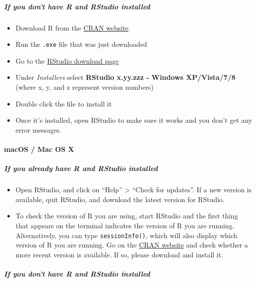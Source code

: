 \documentclass[12pt, krantz2,]{krantz}
\providecommand{\tightlist}{%
  \setlength{\itemsep}{0pt}\setlength{\parskip}{0pt}}
\let\oldparagraph\paragraph
\renewcommand{\paragraph}[1]{\oldparagraph{#1}\mbox{}}
\let\oldsubparagraph\subparagraph
\renewcommand{\subparagraph}[1]{\oldsubparagraph{#1}\mbox{}}
\theoremstyle{definition}
\theoremstyle{definition}
\theoremstyle{definition}
\newcommand{\1}{\mathbbm{1}}
\begin{document}
\hypertarget{if-you-dont-have-r-and-rstudio-installed}{%
\subparagraph{If you don't have R and RStudio installed}\label{if-you-dont-have-r-and-rstudio-installed}}

\begin{itemize}
\tightlist
\item
  Download R from
  the \href{http://cran.r-project.org/bin/windows/base/release.htm}{CRAN website}.
\item
  Run the \texttt{.exe} file that was just downloaded
\item
  Go to the \href{https://www.rstudio.com/products/rstudio/download/\#download}{RStudio download page}
\item
  Under \emph{Installers} select \textbf{RStudio x.yy.zzz - Windows
  XP/Vista/7/8} (where x, y, and z represent version numbers)
\item
  Double click the file to install it
\item
  Once it's installed, open RStudio to make sure it works and you don't get any
  error messages.
\end{itemize}

\hypertarget{macos-mac-os-x}{%
\paragraph{macOS / Mac OS X}\label{macos-mac-os-x}}

\hypertarget{if-you-already-have-r-and-rstudio-installed-1}{%
\subparagraph{If you already have R and RStudio installed}\label{if-you-already-have-r-and-rstudio-installed-1}}

\begin{itemize}
\tightlist
\item
  Open RStudio, and click on ``Help'' \textgreater{} ``Check for updates''. If a new version is
  available, quit RStudio, and download the latest version for RStudio.
\item
  To check the version of R you are using, start RStudio and the first thing
  that appears on the terminal indicates the version of R you are running.
  Alternatively, you can type \texttt{sessionInfo()}, which will also display which
  version of R you are running. Go on the \href{https://cran.r-project.org/bin/macosx/}{CRAN
  website} and check whether a more
  recent version is available. If so, please download and install it.
\end{itemize}

\hypertarget{if-you-dont-have-r-and-rstudio-installed-1}{%
\subparagraph{If you don't have R and RStudio installed}\label{if-you-dont-have-r-and-rstudio-installed-1}}
\end{document}
